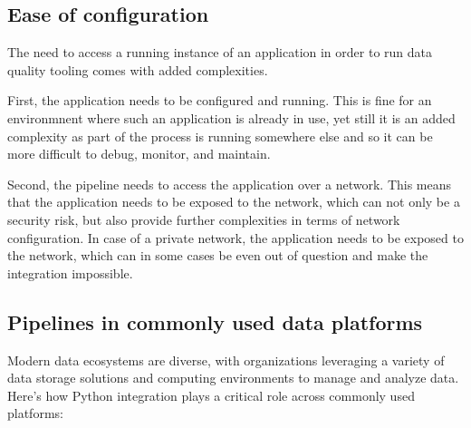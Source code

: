 \subsection{Ease of configuration}

The need to access a running instance of an application in order to run data quality tooling comes with added complexities.

First, the application needs to be configured and running. This is fine for an environmnent where such an application is already in use, yet still it is an added complexity as part of the process is running somewhere else and so it can be more difficult to debug, monitor, and maintain.

Second, the pipeline needs to access the application over a network. This means that the application needs to be exposed to the network, which can not only be a security risk, but also provide further complexities in terms of network configuration. In case of a private network, the application needs to be exposed to the network, which can in some cases be even out of question and make the integration impossible.

\subsection{Pipelines in commonly used data platforms}

Modern data ecosystems are diverse, with organizations leveraging a variety of data storage solutions and computing environments to manage and analyze data. Here’s how Python integration plays a critical role across commonly used platforms:

